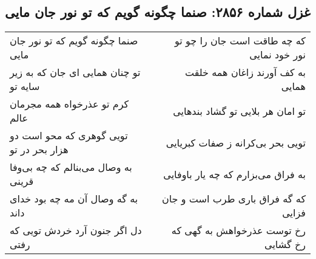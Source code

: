 \begin{center}
\section*{غزل شماره ۲۸۵۶: صنما چگونه گویم که تو نور جان مایی}
\label{sec:2856}
\begin{longtable}{l p{0.5cm} r}
صنما چگونه گویم که تو نور جان مایی
&&
که چه طاقت است جان را چو تو نور خود نمایی
\\
تو چنان همایی ای جان که به زیر سایه تو
&&
به کف آورند زاغان همه خلقت همایی
\\
کرم تو عذرخواه همه مجرمان عالم
&&
تو امان هر بلایی تو گشاد بندهایی
\\
تویی گوهری که محو است دو هزار بحر در تو
&&
تویی بحر بی‌کرانه ز صفات کبریایی
\\
به وصال می‌بنالم که چه بی‌وفا قرینی
&&
به فراق می‌بزارم که چه یار باوفایی
\\
به گه وصال آن مه چه بود خدای داند
&&
که گه فراق باری طرب است و جان فزایی
\\
دل اگر جنون آرد خردش تویی که رفتی
&&
رخ توست عذرخواهش به گهی که رخ گشایی
\\
\end{longtable}
\end{center}
